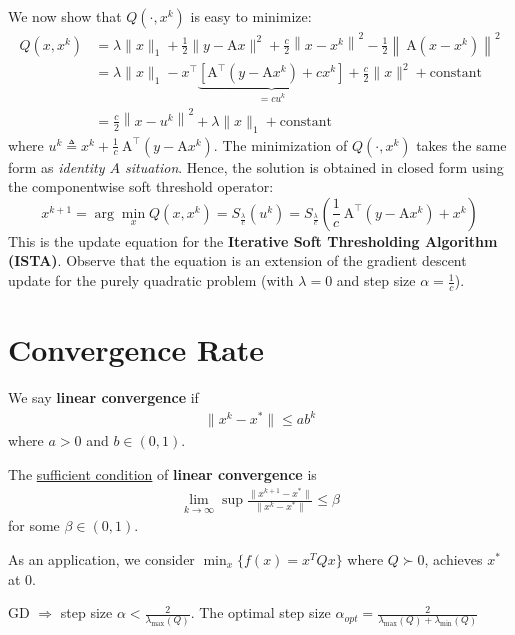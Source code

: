 \documentclass[11pt]{elegantbook}
\begin{document}
We now show that $Q\left(\cdot, x^k\right)$ is easy to minimize:
$$
\begin{aligned}
Q\left(x, x^k\right) &=\lambda\|x\|_1+\frac{1}{2}\|y-\mathrm{A} x\|^2+\frac{c}{2}\left\|x-x^k\right\|^2-\frac{1}{2}\left\|\mathrm{~A}\left(x-x^k\right)\right\|^2 \\
&=\lambda\|x\|_1-x^{\top} \underbrace{\left[\mathrm{A}^{\top}\left(y-\mathrm{A} x^k\right)+c x^k\right]}_{=c u^k}+\frac{c}{2}\|x\|^2+\mathrm{constant} \\
&=\frac{c}{2}\left\|x-u^k\right\|^2+\lambda\|x\|_1+\mathrm{constant}
\end{aligned}
$$
where $u^k \triangleq x^k+\frac{1}{c} \mathrm{~A}^{\top}\left(y-\mathrm{A} x^k\right)$. The minimization of $Q\left(\cdot, x^k\right)$ takes the same form as \textit{identity $A$ situation}. Hence, the solution is obtained in closed form using the componentwise soft threshold operator:
$$
x^{k+1}=\arg \min _x Q\left(x, x^k\right)=S_{\frac{\lambda}{c}}\left(u^k\right)=S_{\frac{\lambda}{c}}\left(\frac{1}{c} \mathrm{~A}^{\top}\left(y-\mathrm{A} x^k\right)+x^k\right)
$$
This is the update equation for the \textbf{Iterative Soft Thresholding Algorithm (ISTA)}. Observe that the equation is an extension of the gradient descent update for the purely quadratic problem (with $\lambda=0$ and step size $\alpha=\frac{1}{c}$).

\section{Convergence Rate}
We say \textbf{linear convergence} if
\begin{equation}
    \begin{aligned}
        \|x^k-x^*\|\leq ab^k
    \end{aligned}
    \nonumber
\end{equation}
where $a>0$ and $b\in (0,1)$.

The \underline{sufficient condition} of \textbf{linear convergence} is
\begin{equation}
    \begin{aligned}
        \lim_{k \rightarrow \infty}\sup\frac{\|x^{k+1}-x^*\|}{\|x^k-x^*\|}\leq \beta
    \end{aligned}
    \nonumber
\end{equation}
for some $\beta\in (0,1)$.

As an application, we consider $\min_x\{f(x)=x^TQx\}$ where $Q\succ 0$, achieves $x^*$ at $0$.

GD $\Rightarrow $ step size $\alpha<\frac{2}{\lambda_{\max}(Q)}$. The optimal step size $\alpha_{opt}=\frac{2}{\lambda_{\max}(Q)+\lambda_{\min}(Q)}$
\end{document}
